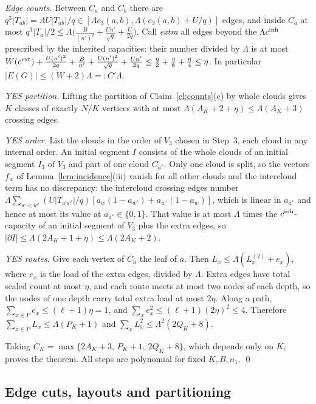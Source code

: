 \documentclass[11pt,letterpaper]{article}
\theoremstyle{definition}
\theoremstyle{remark}
\begin{document}
\emph{Edge counts.} Between \(C_a\) and \(C_b\) there are
\(q^3|T_{ab}|=\Lambda U|T_{ab}|/q\in[\Lambda c_3(a,b),\Lambda(c_3(a,b)+U/q)]\)
edges, and inside \(C_a\) at most \(q^3|T_a|/2\le\Lambda\bigl(\frac B{(n')^2}
+\frac{Un'}{\sqrt q}+\frac U{2q}\bigr)\). Call \emph{extra} all edges beyond
the \(\Lambda c^{\rm inh}\) prescribed by the inherited capacities: their
number divided by \(\Lambda\) is at most
\(W(c^{\rm ext})+\frac{U(n')^2}{2q}+\frac B{n'}+\frac{U(n')^2}{\sqrt q}
+\frac{Un'}{2q}\le\frac\eta2+\frac\eta8+\frac\eta4\le\eta\). In particular
\(|E(G)|\le(W+2)\Lambda=:C'\Lambda\).

\emph{YES partition.} Lifting the partition of Claim~\ref{cl:counts}(c) by
whole clouds gives \(K\) classes of exactly \(N/K\) vertices with at most
\(\Lambda(A_K+2+\eta)\le\Lambda(A_K+3)\) crossing edges.

\emph{YES order.} List the clouds in the order of \(V_3\) chosen in Step~3,
each cloud in any internal order. An initial segment \(I\) consists of the
whole clouds of an initial segment \(I_3\) of \(V_3\) and part of one cloud
\(C_{a^*}\). Only one cloud is split, so the vectors \(f_w\) of
Lemma~\ref{lem:incidence}(iii) vanish for all other clouds and the
intercloud term has no discrepancy: the intercloud crossing edges number
\(\Lambda\sum_{w<w'}(U|T_{ww'}|/q)[a_w(1-a_{w'})+a_{w'}(1-a_w)]\), which is
linear in \(a_{a^*}\) and hence at most its value at \(a_{a^*}\in\{0,1\}\).
That value is at most \(\Lambda\) times the \(c^{\rm inh}\)-capacity of an
initial segment of \(V_3\) plus the extra edges, so \(|\partial I|\le
\Lambda(2A_K+1+\eta)\le\Lambda(2A_K+2)\).

\emph{YES routes.} Give each vertex of \(C_a\) the leaf of \(a\). Then
\(L_x\le\Lambda(L^{(2)}_x+e_x)\), where \(e_x\) is the load of the extra
edges, divided by \(\Lambda\). Extra edges have total scaled count at most
\(\eta\), and each route meets at most two nodes of each depth, so the
nodes of one depth carry total extra load at most \(2\eta\). Along a path,
\(\sum_{x\in P}e_x\le(\ell+1)\eta=1\), and
\(\sum_xe_x^2\le(\ell+1)(2\eta)^2\le4\). Therefore
\(\sum_{x\in P}L_x\le\Lambda(P_K+1)\) and
\(\sum_xL_x^2\le\Lambda^2(2Q_K+8)\).

Taking \(C_K=\max\{2A_K+3,\,P_K+1,\,2Q_K+8\}\), which depends only on \(K\),
proves the theorem. All steps are polynomial for fixed \(K,B,n_1\). \qed

\subsection{Edge cuts, layouts and partitioning}\label{sec:edge}
\end{document}
